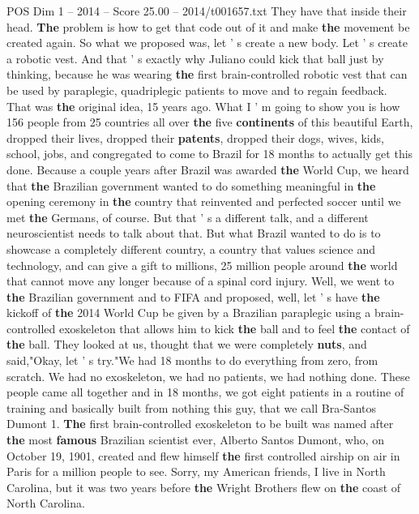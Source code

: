 \begin{textsample}{POS Dim 1 – 2014 – Score 25.00 – 2014/t001657.txt}
They have that inside their head. \textbf{The} problem is how to get that code out of it and make \textbf{the} movement be created again.
So what we proposed was, let ' s create a new body.
Let ' s create a robotic vest.
And that ' s exactly why Juliano could kick that ball just by thinking, because he was wearing \textbf{the} first brain-controlled robotic vest that can be used by paraplegic, quadriplegic patients to move and to regain feedback.
That was \textbf{the} original idea, 15 years ago.
What I ' m going to show you is how 156 people from 25 countries all over \textbf{the} five \textbf{continents} of this beautiful Earth, dropped their lives, dropped their \textbf{patents}, dropped their dogs, wives, kids, school, jobs, and congregated to come to Brazil for 18 months to actually get this done.
Because a couple years after Brazil was awarded \textbf{the} World Cup, we heard that \textbf{the} Brazilian government wanted to do something meaningful in \textbf{the} opening ceremony in \textbf{the} country that reinvented and perfected soccer until we met \textbf{the} Germans, of course.
But that ' s a different talk, and a different neuroscientist needs to talk about that.
But what Brazil wanted to do is to showcase a completely different country, a country that values science and technology, and can give a gift to millions, 25 million people around \textbf{the} world that cannot move any longer because of a spinal cord injury.
Well, we went to \textbf{the} Brazilian government and to FIFA and proposed, well, let ' s have \textbf{the} kickoff of \textbf{the} 2014 World Cup be given by a Brazilian paraplegic using a brain- controlled exoskeleton that allows him to kick \textbf{the} ball and to feel \textbf{the} contact of \textbf{the} ball.
They looked at us, thought that we were completely \textbf{nuts}, and said,"Okay, let ' s try."We had 18 months to do everything from zero, from scratch.
We had no exoskeleton, we had no patients, we had nothing done.
These people came all together and in 18 months, we got eight patients in a routine of training and basically built from nothing this guy, that we call Bra-Santos Dumont 1. \textbf{The} first brain-controlled exoskeleton to be built was named after \textbf{the} most \textbf{famous} Brazilian scientist ever, Alberto Santos Dumont, who, on October 19, 1901, created and flew himself \textbf{the} first controlled airship on air in Paris for a million people to see.
Sorry, my American friends, I live in North Carolina, but it was two years before \textbf{the} Wright Brothers flew on \textbf{the} coast of North Carolina.

\end{textsample}

